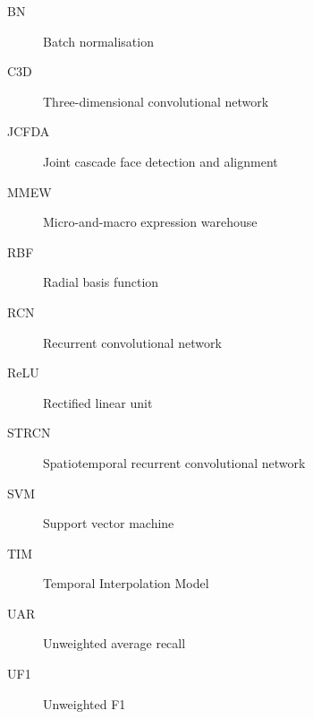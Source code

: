 \begin{description}
    \item[BN] Batch normalisation
    \item[C3D] Three-dimensional convolutional network
    \item[JCFDA] Joint cascade face detection and alignment
    \item[MMEW] Micro-and-macro expression warehouse
    \item[RBF] Radial basis function
    \item[RCN] Recurrent convolutional network
    \item[ReLU] Rectified linear unit
    \item[STRCN] Spatiotemporal recurrent convolutional network
    \item[SVM] Support vector machine
    \item[TIM] Temporal Interpolation Model
    \item[UAR] Unweighted average recall
    \item[UF1] Unweighted F1
\end{description}
